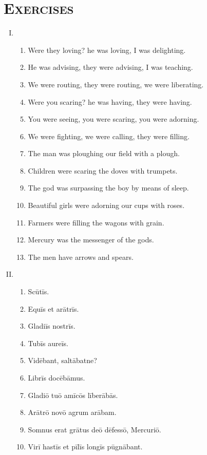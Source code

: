 \documentclass[12pt]{article}
\begin{document}
\section{\textsc{Exercises}}
\begin{enumerate}[I.]
	\setlength{\itemsep}{1em}
	\item \begin{enumerate}[1)]
		\item Were they loving? he was loving, I was delighting.
		\item He was advising, they were advising, I was teaching.
		\item We were routing, they were routing, we were liberating.
		\item Were you scaring? he was having, they were having.
		\item You were seeing, you were scaring, you were adorning.
		\item We were fighting, we were calling, they were filling.
		\item The man was ploughing our field with a plough.
		\item Children were scaring the doves with trumpets.
		\item The god was surpassing the boy by means of sleep.
		\item Beautiful girls were adorning our cups with roses.
		\item Farmers were filling the wagons with grain.
		\item Mercury was the messenger of the gods.
		\item The men have arrows and spears.
	\end{enumerate}
	\item \begin{enumerate}[1)]
		\item Scūtīs.
		\item Equīs et arātrīs.
		\item Gladiīs nostrīs.
		\item Tubīs aureīs.
		\item Vidēbant, saltābatne?
		\item Librīs docēbāmus.
		\item Gladiō tuō amīcōs līberābās.
		\item Arātrō novō agrum arābam.
		\item Somnus erat grātus deō dēfessō, Mercuriō.
		\item Virī hastīs et pīlīs longīs pūgnābant.
	\end{enumerate}
\end{enumerate}
\end{document}
